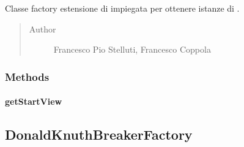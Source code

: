 \documentclass[letterpaper,10pt,italian,openany,oneside]{sphinxmanual}
\begin{document}
\begin{fulllineitems}
\label{\detokenize{source/it/unicam/cs/pa/mastermind/factories/ConsoleStartViewFactory:it.unicam.cs.pa.mastermind.factories.ConsoleStartViewFactory}}
Classe factory estensione di  impiegata per ottenere istanze di .
\begin{quote}\begin{description}
\item[{Author}] \leavevmode
Francesco Pio Stelluti, Francesco Coppola

\end{description}\end{quote}

\end{fulllineitems}



\subsubsection{Methods}
\label{\detokenize{source/it/unicam/cs/pa/mastermind/factories/ConsoleStartViewFactory:methods}}

\paragraph{getStartView}
\label{\detokenize{source/it/unicam/cs/pa/mastermind/factories/ConsoleStartViewFactory:getstartview}}

\begin{fulllineitems}
\label{\detokenize{source/it/unicam/cs/pa/mastermind/factories/ConsoleStartViewFactory:it.unicam.cs.pa.mastermind.factories.ConsoleStartViewFactory.getStartView()}}
\end{fulllineitems}



\subsection{DonaldKnuthBreakerFactory}
\label{\detokenize{source/it/unicam/cs/pa/mastermind/factories/DonaldKnuthBreakerFactory:donaldknuthbreakerfactory}}\label{\detokenize{source/it/unicam/cs/pa/mastermind/factories/DonaldKnuthBreakerFactory::doc}}
\end{document}
